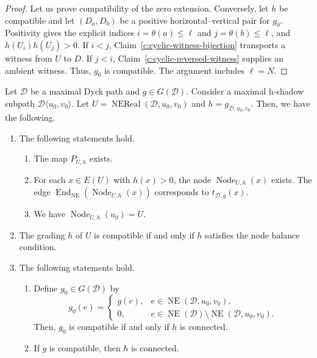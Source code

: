 \begin{proof}
Let us prove compatibility of the zero extension.
Conversely, let $h$ be compatible and let $(D_a,D_b)$ be a positive
horizontal--vertical pair for $g_0$.
Positivity gives the explicit indices $i=\theta(a)\le\ell$ and
$j=\theta(b)\le\ell$, and $h(U_i)h(U_j)>0$.
If $i<j$, Claim~\ref{c:cyclic-witness-bijection} transports a witness from $U$ to $D$.
If $j<i$, Claim~\ref{c:cyclic-reversed-witness} supplies an ambient witness.
Thus, $g_0$ is compatible. The argument includes $\ell=N$.
\end{proof}


\begin{lemma}\label{lem:compatibility}
Let $\mathcal{D}$ be a maximal Dyck path and $g\in G(\mathcal D)$.
Consider a maximal h-shadow subpath $\mathcal{D}\langle u_0,v_0\rangle$.
Let $U=\operatorname{NEReal}(\mathcal{D},u_0,v_0)$ and
$h=g_{\mathcal{D},u_0,v_0}$.
Then, we have the following.

\begin{enumerate}
\item\label{c:shadow-nodes} The following statements hold.
\begin{enumerate}[label=(\alph*),ref=\theenumi(\alph*)]
\item\label{c:shadow-predecessor} The map $P_{U,h}$ exists.
\item\label{c:shadow-node-identity} For each $x\in E(U)$ with $h(x)>0$,
the node $\operatorname{Node}_{U,h}(x)$ exists.
The edge $\operatorname{End}_{\mathrm{NE}}(\operatorname{Node}_{U,h}(x))$ corresponds to $t_{\mathcal{D},g}(x)$.
\item\label{c:shadow-whole-node} We have $\operatorname{Node}_{U,h}(u_0)=U$.
\end{enumerate}
\item\label{c:shadow-compatibility} The grading $h$ of $U$ is compatible
if and only if $h$ satisfies the node balance condition.
\item\label{c:shadow-extension} The following statements hold.
\begin{enumerate}[label=(\alph*),ref=\theenumi(\alph*)]
\item\label{c:shadow-zero-extension} Define $g_0\in G(\mathcal D)$ by
\[
 g_0(e)=\begin{cases}
 g(e),&e\in\operatorname{NE}(\mathcal D,u_0,v_0),\\
 0,&e\in\operatorname{NE}(\mathcal D)\setminus\operatorname{NE}(\mathcal D,u_0,v_0).
 \end{cases}
\]
Then, $g_0$ is compatible if and only if $h$ is connected.
\item\label{c:shadow-restricted-connected} If $g$ is compatible, then $h$ is connected.
\end{enumerate}
\end{enumerate}
\end{lemma}


